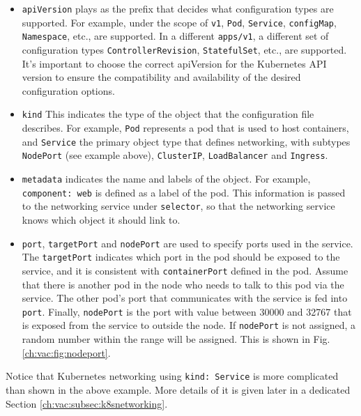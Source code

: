 \begin{itemize}
	\item \verb|apiVersion| plays as the prefix that decides what configuration types are supported. For example, under the scope of \verb|v1|, \verb|Pod|, \verb|Service|, \verb|configMap|, \verb|Namespace|, etc., are supported. In a different \verb|apps/v1|, a different set of configuration types \verb|ControllerRevision|, \verb|StatefulSet|, etc., are supported. It's important to choose the correct apiVersion for the Kubernetes API version to ensure the compatibility and availability of the desired configuration options.
	\item \verb|kind| This indicates the type of the object that the configuration file describes. For example, \verb|Pod| represents a pod that is used to host containers, and \verb|Service| the primary object type that defines networking, with subtypes \verb|NodePort| (see example above), \verb|ClusterIP|, \verb|LoadBalancer| and \verb|Ingress|.
	\item \verb|metadata| indicates the name and labels of the object. For example, \verb|component: web| is defined as a label of the pod. This information is passed to the networking service under \verb|selector|, so that the networking service knows which object it should link to.
	\item \verb|port|, \verb|targetPort| and \verb|nodePort| are used to specify ports used in the service. The \verb|targetPort| indicates which port in the pod should be exposed to the service, and it is consistent with \verb|containerPort| defined in the pod. Assume that there is another pod in the node who needs to talk to this pod via the service. The other pod's port that communicates with the service is fed into \verb|port|. Finally, \verb|nodePort| is the port with value between 30000 and 32767 that is exposed from the service to outside the node. If \verb|nodePort| is not assigned, a random number within the range will be assigned. This is shown in Fig. \ref{ch:vac:fig:nodeport}.
\end{itemize}
Notice that Kubernetes networking using \verb|kind: Service| is more complicated than shown in the above example. More details of it is given later in a dedicated Section \ref{ch:vac:subsec:k8snetworking}.

